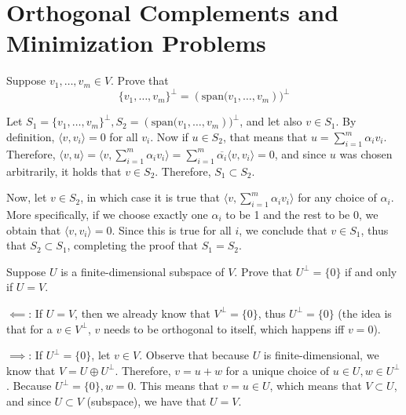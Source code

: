 \section{Orthogonal Complements and Minimization Problems}

\begin{exercise}{1}
    Suppose $v_1, \ldots, v_m \in V$. Prove that
    $$\{ v_1, \ldots, v_m \}^\bot = (\text{span(}v_1, \ldots, v_m))^\bot$$
\end{exercise}
\begin{solution}

    Let $S_1 = \{ v_1, \ldots, v_m \}^\bot, S_2 = (\text{span(}v_1, \ldots, v_m))^\bot$, and let also $v \in S_1$. By definition, $\langle v, v_i \rangle = 0$ for all $v_i$. Now if $u \in S_2$, that means that $u = \sum_{i=1}^{m} \alpha_i v_i$. Therefore, $\langle v, u \rangle = \langle v,  \sum_{i=1}^{m} \alpha_i v_i \rangle = \sum_{i=1}^{m} \overline{\alpha_i } \langle v, v_i \rangle = 0$, and since $u$ was chosen arbitrarily, it holds that $v \in S_2$. Therefore, $S_1 \subset S_2$.

    Now, let $v \in S_2$, in which case it is true that $\langle v, \sum_{i=1}^{m} \alpha_i v_i \rangle$ for any choice of $\alpha_i$. More specifically, if we choose exactly one $\alpha_i$ to be 1 and the rest to be 0, we obtain that $\langle v, v_i \rangle = 0$. Since this is true for all $i$, we conclude that $v \in S_1$, thus that $S_2 \subset S_1$, completing the proof that $S_1 = S_2$.
\end{solution}

\begin{exercise}{2}
    Suppose $U$ is a finite-dimensional subspace of $V$. Prove that $U^\bot = \{0\}$ if and only if $U = V$.
\end{exercise}

\begin{solution}

    $\impliedby$: If $U = V$, then we already know that $V^\bot = \{0\}$, thus $U^\bot = \{0\}$ (the idea is that for a $v \in V^\bot$, $v$ needs to be orthogonal to itself, which happens iff $v = 0$).
    
    $\implies$: If $U^\bot = \{0\}$, let $v \in V$. Observe that because $U$ is finite-dimensional, we know that $V = U \oplus U^\bot$. Therefore, $v = u + w$ for a unique choice of $u \in U, w \in U^{\bot}$. Because $U^\bot = \{0\}, w = 0$. This means that $v = u \in U$, which means that $V \subset U$, and since $U \subset V$ (subspace), we have that $U = V$.
\end{solution}

